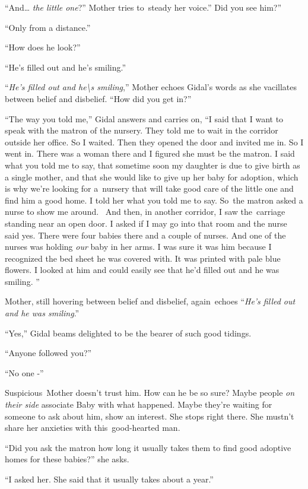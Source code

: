 \documentclass[twoside,11pt]{book}
\begin{document}
``And{\dots} \textit{the little one}?'' Mother tries to~steady her voice.'' Did
you see him?'' 

``Only from a distance.'' 

``How does he look?'' 

``He's filled out and he's smiling.'' 

``\textit{He's filled out and he{\textbackslash}s smiling},'' Mother echoes Gidal's words as
she vacillates between belief and disbelief. ``How did you get in?'' 

``The way you told me,'' Gidal answers and carries on, ``I said that I want to
speak with the matron of the nursery. They told me to wait in the corridor outside her office. So I waited. Then they
opened the door and invited me in. So I went in. There was a woman there and I figured she must be the matron. I said
what you told me to say, that sometime soon my daughter is due to give birth as a single mother, and that she would
like to give up her baby for adoption, which is why we're looking for a~nursery that will take good care of the little
one and find him a good home. I told her what you told me to say. So~the matron asked a nurse to show me around.~ And
then, in another corridor, I saw the~carriage standing near an open door. I asked if I may go into that room and the
nurse said yes. There were four babies there and a couple of nurses. And one of the nurses was holding\textit{ our
}baby in her arms. I was sure it was him because I recognized the bed sheet he was covered with. It was printed with
pale blue flowers. I looked at him and could easily see that he'd filled out and he was smiling. '' 

Mother, still hovering between belief and disbelief, again{\ }echoes
``\textit{He's filled out and he was smiling}.'' 

``Yes,'' Gidal beams delighted to be the bearer of such good tidings. 

``Anyone followed you?'' 

``No one -'' 

Suspicious{\ }Mother doesn't trust him. How can he be so sure? Maybe people
\textit{on their side} associate Baby with what happened. Maybe they're waiting for someone to ask about him, show an
interest. She stops right there. She mustn't share her anxieties with this\ good{}-hearted man. 

``Did you ask the matron how long it usually takes them to find good adoptive homes for these
babies?'' she asks.

``I asked her. She said that it usually takes about a year.'' 
\end{document}
